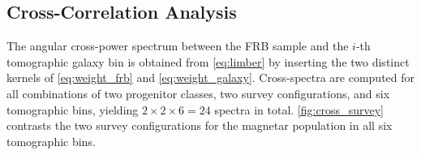 \subsection{Cross-Correlation Analysis} \label{sec:cross_correlation_analysis}
The angular cross-power spectrum between the FRB sample and the $i$-th tomographic galaxy bin is
obtained from \autoref{eq:limber} by inserting the two distinct kernels of \autoref{eq:weight_frb}
and \autoref{eq:weight_galaxy}. Cross-spectra are computed for all combinations of two progenitor
classes, two survey configurations, and six tomographic bins, yielding $2\times2\times6 = 24$ spectra
in total.
\autoref{fig:cross_survey} contrasts the two survey configurations for the magnetar population
in all six tomographic bins.

